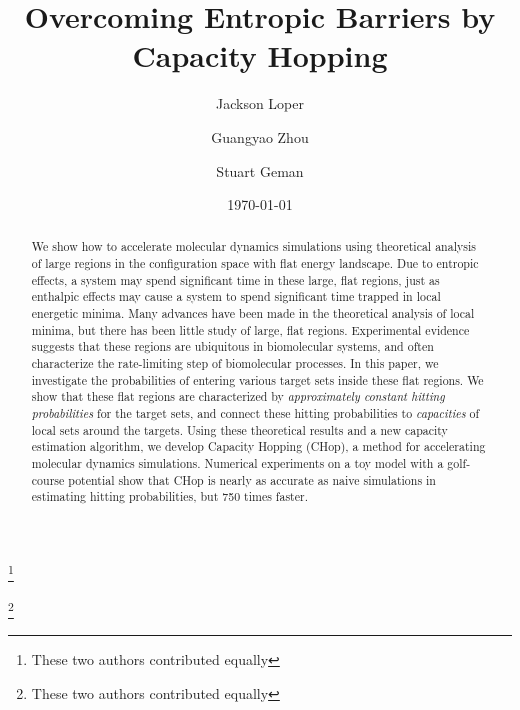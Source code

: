 \documentclass[english, aip, jcp, priprint, graphicx]{revtex4-1}
\theoremstyle{plain}
\theoremstyle{definition}
\theoremstyle{plain}
\begin{document}
\title{Overcoming Entropic Barriers by Capacity Hopping} %

\author{Jackson Loper}
\thanks{These two authors contributed equally}

\author{Guangyao Zhou}
\thanks{These two authors contributed equally}

\author{Stuart Geman}

\date{\today}

\begin{abstract}
	We show how to accelerate molecular dynamics simulations using theoretical analysis of large regions in the configuration space with flat energy landscape. Due to entropic effects, a system may spend significant time in these large, flat regions, just as enthalpic effects may cause a system to spend significant time trapped in local energetic minima.  Many advances have been made in the theoretical analysis of local minima, but there has been little study of large, flat regions. Experimental evidence suggests that these regions are ubiquitous in biomolecular systems, and often characterize the rate-limiting step of biomolecular processes.  In this paper, we investigate the probabilities of entering various target sets inside these flat regions. We show that these flat regions are characterized by \emph{approximately constant hitting probabilities} for the target sets, and connect these hitting probabilities to \textit{capacities} of local sets around the targets.  Using these theoretical results and a new capacity estimation algorithm, we develop Capacity Hopping (CHop), a method for accelerating molecular dynamics simulations. Numerical experiments on a toy model with a golf-course potential show that CHop is nearly as accurate as naive simulations in estimating hitting probabilities, but 750 times faster.
\end{abstract}

\pacs{}%

\maketitle %
\end{document}
